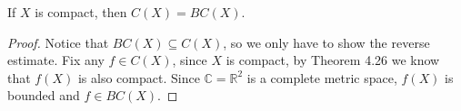 \documentclass[../../main.tex]{subfiles}
\begin{document}
\begin{wts}
If $X$ is compact, then $C(X)=BC(X)$.
\end{wts}
\begin{proof}
Notice that $BC(X)\subseteq C(X)$, so we only have to show the reverse estimate. Fix any $f\in C(X)$, since $X$ is compact, by Theorem 4.26 we know that $f(X)$ is also compact. Since $\mathbb{C}=\mathbb{R}^2$ is a complete metric space, $f(X)$ is bounded and $f\in BC(X)$.
\end{proof}
\end{document}

